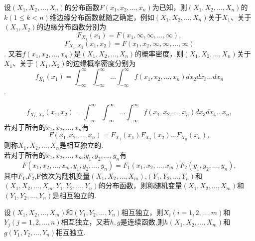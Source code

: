 \begin{definition*}

    设$(X_1,X_2,\dots,X_n)$的分布函数$F(x_1,x_2,\dots,x_n)$为已知，则$(X_1,X_2,\dots,X_n)$的$k(1 \leq k < n )$维边缘分布函数就随之确定，例如$(X_1,X_2,\dots,X_n)$关于$X_1$、关于$(X_1,X_2)$的边缘分布函数分别为
    \[F_{X_1}(x_1) = F(x_1,\infty,\infty,\dots,\infty),\]
    \[F_{X_1,X_2}(x_1,x_2) = F(x_1,x_2,\infty,\infty,\dots,\infty)\].
又若$f(x_1,x_2,\dots,x_n)$是$(X_1,X_2,\dots,X_n)$的概率密度，则$(X_1,X_2,\dots,X_n)$关于$X_1$、关于$(X_1,X_2)$的边缘概率密度分别为
    \[f_{X_1}(x_1) = \int_{-\infty}^{\infty}\int_{-\infty}^{\infty}
    \dots \int_{-\infty}^{\infty}f(x_1,x_2,\dots,x_n)d{x_2}d{x_3}\dots d{x_n}\].

    \[f_{X_1,X_2}\left(x_1,x_2\right) = \int_{-\infty}^{\infty} \int_{-\infty}^{\infty} \dots \int_{-\infty}^{\infty}f\left(x_1,x_2,\dots,x_n\right)d{x_3}d{x_4} \dots {x_n},\]
    \quad 若对于所有的$x_1,x_2,\dots,x_n$有
    \[F\left(x_1,x_2,\dots,x_n\right) = F_{X_1}\left(x_1\right)F_{X_2}\left(x_2\right)\dots F_{X_n}\left(x_n\right),\]
    则称$X_1,X_2,\dots,X_n$是相互独立的.\\
    若对于所有的$x_1,x_2,\dots,x_m$;$y_1,y_2,\dots,y_n$有
    \[F\left(x_1,x_2,\dots,x_m,y_1,y_2,\dots,y_n\right) = F_1\left(x_1,x_2,\dots,x_m\right)F_2\left(y_1,y_2,\dots,y_n\right),\]
    其中$F_1$,$F_2$,F依次为随机变量$\left(X_1,X_2,\dots,X_m\right)$,$\left(Y_1,Y_2,\dots,Y_n\right)$和$\left(X_1,X_2,\dots,X_m,Y_1,Y_2,\dots,Y_n\right)$的分布函数，则称随机变量$\left(X_1,X_2,\dots,X_m\right)$和$\left(Y_1,Y_2,\dots,Y_n\right)$是相互独立的.
\end{definition*}


\begin{theorem}
    设$\left(X_1,X_2,\dots,X_m\right)$和$\left(Y_1,Y_2,\dots,Y_n\right)$相互独立，则$X_i\left(i = 1,2,\dots,m\right)$和$Y_j\left(j = 1,2,\dots,n\right)$相互独立，又若$h,g$是连续函数,则$h\left(X_1,X_2,\dots,X_m\right)$和$g\left(Y_1,Y_2,\dots,Y_n\right)$相互独立.
\end{theorem}
